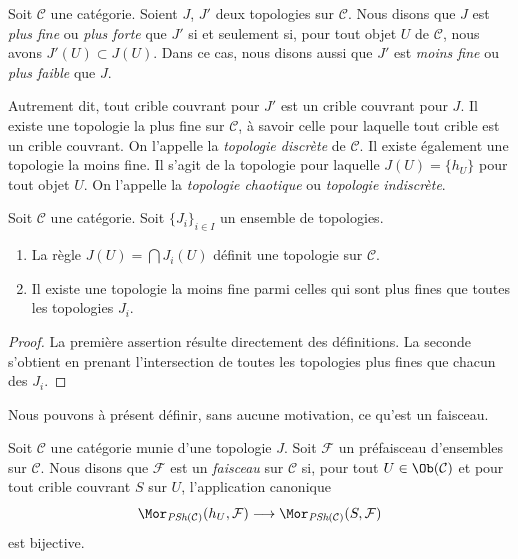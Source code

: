 \begin{definition}
\label{definition-finer}
Soit $\mathcal{C}$ une catégorie. Soient $J$, $J'$ deux
topologies sur $\mathcal{C}$. Nous disons que $J$ est
{\it plus fine} ou {\it plus forte} que $J'$ si et seulement si, pour tout objet
$U$ de $\mathcal{C}$, nous avons $J'(U) \subset J(U)$.
Dans ce cas, nous disons aussi que $J'$ est
{\it moins fine} ou {\it plus faible} que $J$.
\end{definition}

\noindent
Autrement dit, tout crible couvrant pour $J'$ est un
crible couvrant pour $J$. Il existe une topologie la plus fine
sur $\mathcal{C}$, à savoir celle pour laquelle tout crible
est un crible couvrant. On l'appelle la
{\it topologie discrète} de $\mathcal{C}$.
Il existe également une topologie la moins fine.
Il s'agit de la topologie pour laquelle $J(U) = \{h_U\}$
pour tout objet $U$. On l'appelle la
{\it topologie chaotique} ou {\it topologie indiscrète}.

\begin{lemma}
\label{lemma-play-with-topologies}
Soit $\mathcal{C}$ une catégorie.
Soit $\{J_i\}_{i\in I}$ un ensemble de topologies.
\begin{enumerate}
\item La règle $J(U) = \bigcap J_i(U)$ définit
une topologie sur $\mathcal{C}$.
\item Il existe une topologie la moins fine parmi celles qui sont plus fines que
toutes les topologies $J_i$.
\end{enumerate}
\end{lemma}

\begin{proof}
La première assertion résulte directement des définitions.
La seconde s'obtient en prenant l'intersection
de toutes les topologies plus fines que chacun des $J_i$.
\end{proof}

\noindent
Nous pouvons à présent définir,
sans aucune motivation, ce qu'est un faisceau.

\begin{definition}
\label{definition-sheaf-sets-topology}
Soit $\mathcal{C}$ une catégorie munie d'une
topologie $J$. Soit $\mathcal{F}$ un préfaisceau d'ensembles
sur $\mathcal{C}$.
Nous disons que $\mathcal{F}$ est un
{\it faisceau} sur $\mathcal{C}$
si, pour tout $U \in \Ob(\mathcal{C})$ et pour
tout crible couvrant $S$ sur $U$, l'application canonique
$$
\Mor_{\textit{PSh}(\mathcal{C})}(h_U, \mathcal{F})
\longrightarrow
\Mor_{\textit{PSh}(\mathcal{C})}(S, \mathcal{F})
$$
est bijective.
\end{definition}

